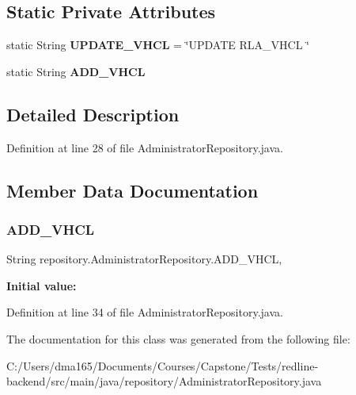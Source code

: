 \subsection*{Static Private Attributes}
\begin{DoxyCompactItemize}
\item 
\mbox{\label{classrepository_1_1_administrator_repository_ac167c30a77017f08b722169aa6231b11}} 
static String {\bfseries U\+P\+D\+A\+T\+E\+\_\+\+V\+H\+CL} = \char`\"{}U\+P\+D\+A\+TE R\+L\+A\+\_\+\+V\+H\+CL \char`\"{}
\item 
static String {\bfseries A\+D\+D\+\_\+\+V\+H\+CL}
\end{DoxyCompactItemize}


\subsection{Detailed Description}


Definition at line 28 of file Administrator\+Repository.\+java.



\subsection{Member Data Documentation}
\mbox{\label{classrepository_1_1_administrator_repository_a2f23aa21d7e268573bf0cc2dd634f843}} 
\subsubsection{\texorpdfstring{ADD\_VHCL}{ADD\_VHCL}}
{\footnotesize\ttfamily String repository.\+Administrator\+Repository.\+A\+D\+D\+\_\+\+V\+H\+CL\hspace{0.3cm}{\ttfamily [static]}, {\ttfamily [private]}}

{\bfseries Initial value\+:}
\begin{DoxyCode}{0}
\DoxyCodeLine{= \textcolor{stringliteral}{"INSERT INTO RLA\_VHCL (VHCL\_VIN, VHCL\_MAKE, VHCL\_MODL, VHCL\_YEAR, VHCL\_TRNS, "}}
\DoxyCodeLine{            + \textcolor{stringliteral}{"VHCL\_DRTN, VHCL\_COLR, VHCL\_DESC, VHCL\_TYPE, VHCL\_PRICE, VHCL\_MILG, VHCL\_PICS) VALUES("}}

\end{DoxyCode}


Definition at line 34 of file Administrator\+Repository.\+java.



The documentation for this class was generated from the following file\+:\begin{DoxyCompactItemize}
\item 
C\+:/\+Users/dma165/\+Documents/\+Courses/\+Capstone/\+Tests/redline-\/backend/src/main/java/repository/Administrator\+Repository.\+java\end{DoxyCompactItemize}
